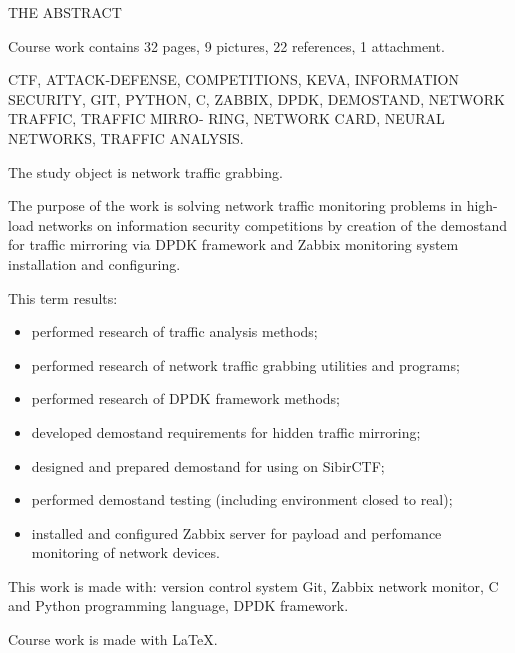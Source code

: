 \clearpage

\begin{center}
THE ABSTRACT
\end{center}

Course work contains 32 pages, 9 pictures, 22 references, 1 attachment.\par

CTF, ATTACK-DEFENSE, COMPETITIONS, KEVA, INFORMATION SECURITY, GIT, PYTHON, C, ZABBIX,
DPDK, DEMOSTAND, NETWORK TRAFFIC, TRAFFIC MIRRO- RING, NETWORK CARD, NEURAL NETWORKS, TRAFFIC ANALYSIS.\par

The study object is network traffic grabbing.\par

The purpose of the work is solving network traffic monitoring problems in high-load networks on information security competitions by creation of the demostand for traffic mirroring via DPDK framework and Zabbix monitoring system installation and configuring.\par

This term results:

\begin{itemize}
    \item performed research of traffic analysis methods;
    \item performed research of network traffic grabbing utilities and programs;
    \item performed research of DPDK framework methods;
    \item developed demostand requirements for hidden traffic mirroring;
    \item designed and prepared demostand for using on SibirCTF;
    \item performed demostand testing (including environment closed to real);
    \item installed and configured Zabbix server for payload and perfomance monitoring of network devices.
\end{itemize}

This work is made with: version control system Git, Zabbix network monitor, C and Python programming language, DPDK framework.\par

Course work is made with \LaTeX.\par

\clearpage